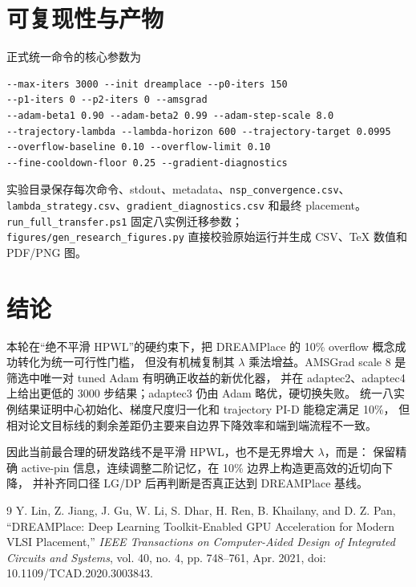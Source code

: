 \documentclass[UTF8,fontset=windows,a4paper,11pt]{ctexart}
\newcommand{\code}[1]{\texttt{#1}}
\begin{document}
\section{可复现性与产物}

正式统一命令的核心参数为
\begin{verbatim}
--max-iters 3000 --init dreamplace --p0-iters 150
--p1-iters 0 --p2-iters 0 --amsgrad
--adam-beta1 0.90 --adam-beta2 0.99 --adam-step-scale 8.0
--trajectory-lambda --lambda-horizon 600 --trajectory-target 0.0995
--overflow-baseline 0.10 --overflow-limit 0.10
--fine-cooldown-floor 0.25 --gradient-diagnostics
\end{verbatim}

实验目录保存每次命令、stdout、metadata、\code{nsp\_convergence.csv}、
\code{lambda\_strategy.csv}、\code{gradient\_diagnostics.csv} 和最终 placement。
\code{run\_full\_transfer.ps1} 固定八实例迁移参数；
\code{figures/gen\_research\_figures.py} 直接校验原始运行并生成 CSV、TeX 数值和 PDF/PNG 图。

\section{结论}

本轮在“绝不平滑 HPWL”的硬约束下，把 DREAMPlace 的 10\% overflow 概念成功转化为统一可行性门槛，
但没有机械复制其 $\lambda$ 乘法增益。AMSGrad scale 8 是筛选中唯一对 tuned Adam 有明确正收益的新优化器，
并在 adaptec2、adaptec4 上给出更低的 3000 步结果；adaptec3 仍由 Adam 略优，硬切换失败。
统一八实例结果证明中心初始化、梯度尺度归一化和 trajectory PI-D 能稳定满足 10\%，
但相对论文目标线的剩余差距仍主要来自边界下降效率和端到端流程不一致。

因此当前最合理的研发路线不是平滑 HPWL，也不是无界增大 $\lambda$，而是：
保留精确 active-pin 信息，连续调整二阶记忆，在 10\% 边界上构造更高效的近切向下降，
并补齐同口径 LG/DP 后再判断是否真正达到 DREAMPlace 基线。

\begin{thebibliography}{9}
Y. Lin, Z. Jiang, J. Gu, W. Li, S. Dhar, H. Ren, B. Khailany, and D. Z. Pan,
``DREAMPlace: Deep Learning Toolkit-Enabled GPU Acceleration for Modern VLSI Placement,''
\emph{IEEE Transactions on Computer-Aided Design of Integrated Circuits and Systems},
vol. 40, no. 4, pp. 748--761, Apr. 2021, doi: 10.1109/TCAD.2020.3003843.
\end{thebibliography}
\end{document}
